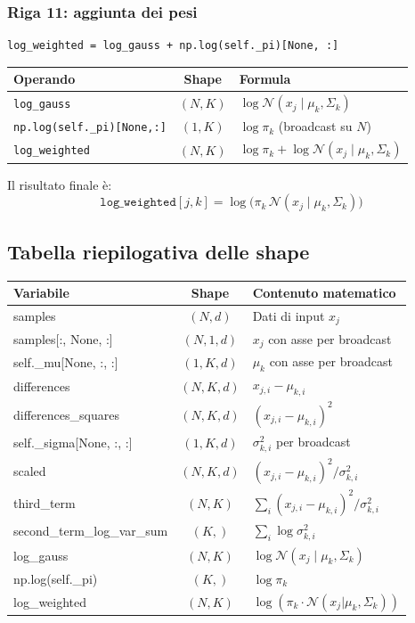 \documentclass[11pt,a4paper]{article}
\begin{document}
\subsubsection{Riga 11: aggiunta dei pesi}
\begin{lstlisting}
log_weighted = log_gauss + np.log(self._pi)[None, :]
\end{lstlisting}

\begin{center}
\renewcommand{\arraystretch}{1.3}
\begin{tabular}{lcl}
\toprule
\textbf{Operando} & \textbf{Shape} & \textbf{Formula} \\
\midrule
\texttt{log\_gauss} & $(N,K)$ &
$\log\mathcal{N}(x_j \mid \mu_k,\Sigma_k)$ \\
\texttt{np.log(self.\_pi)[None,:]} & $(1,K)$ &
$\log\pi_k$ (broadcast su $N$) \\
\midrule
\texttt{log\_weighted} & $(N,K)$ &
$\log\pi_k + \log\mathcal{N}(x_j \mid \mu_k,\Sigma_k)$ \\
\bottomrule
\end{tabular}
\end{center}

Il risultato finale è:
\[
  \texttt{log\_weighted}[j,k] = \log\!\bigl(\pi_k \,
  \mathcal{N}(x_j \mid \mu_k, \Sigma_k)\bigr)
\]

\subsection{Tabella riepilogativa delle shape}

\begin{center}
\renewcommand{\arraystretch}{1.3}
\small
\begin{tabular}{>{\ttfamily}l c l}
\toprule
\textbf{Variabile} & \textbf{Shape} & \textbf{Contenuto matematico} \\
\midrule
samples & $(N, d)$ & Dati di input $x_j$ \\
samples[:, None, :] & $(N, 1, d)$ & $x_j$ con asse per broadcast \\
self.\_mu[None, :, :] & $(1, K, d)$ & $\mu_k$ con asse per broadcast \\
differences & $(N, K, d)$ & $x_{j,i} - \mu_{k,i}$ \\
differences\_squares & $(N, K, d)$ & $(x_{j,i} - \mu_{k,i})^2$ \\
self.\_sigma[None, :, :] & $(1, K, d)$ & $\sigma_{k,i}^2$ per broadcast \\
scaled & $(N, K, d)$ & $(x_{j,i}-\mu_{k,i})^2 / \sigma_{k,i}^2$ \\
third\_term & $(N, K)$ & $\sum_i (x_{j,i}-\mu_{k,i})^2/\sigma_{k,i}^2$ \\
second\_term\_log\_var\_sum & $(K,)$ & $\sum_i \log\sigma_{k,i}^2$ \\
log\_gauss & $(N, K)$ & $\log\mathcal{N}(x_j \mid \mu_k, \Sigma_k)$ \\
np.log(self.\_pi) & $(K,)$ & $\log\pi_k$ \\
log\_weighted & $(N, K)$ & $\log(\pi_k \cdot \mathcal{N}(x_j|\mu_k,\Sigma_k))$ \\
\bottomrule
\end{tabular}
\end{center}
\end{document}
